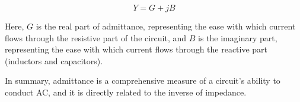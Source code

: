 \[
Y = G + jB
\]

Here, \( G \) is the real part of admittance, representing the ease with which current flows through the resistive part of the circuit, and \( B \) is the imaginary part, representing the ease with which current flows through the reactive part (inductors and capacitors).

In summary, admittance is a comprehensive measure of a circuit's ability to conduct AC, and it is directly related to the inverse of impedance.

